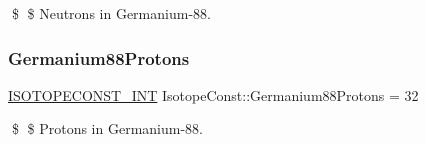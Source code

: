 \$ \$ Neutrons in Germanium-\/88. \mbox{\label{group___isotope_const-_germanium-_ge88_ga199e6a691bb81a9f4c43a4ff8adb1c36}} 
\subsubsection{\texorpdfstring{Germanium88\+Protons}{Germanium88Protons}}
{\footnotesize\ttfamily \mbox{\hyperlink{group___isotope_const-_macros_ga5f18360b3e99483a35c32d789e62621c}{I\+S\+O\+T\+O\+P\+E\+C\+O\+N\+S\+T\+\_\+\+I\+NT}} Isotope\+Const\+::\+Germanium88\+Protons = 32}

\$ \$ Protons in Germanium-\/88. 